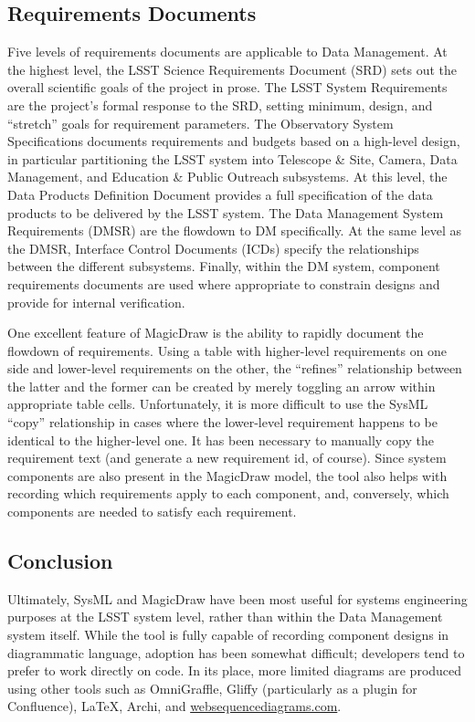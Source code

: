 \subsection{Requirements Documents}

Five levels of requirements documents are applicable to Data Management.
At the highest level, the LSST Science Requirements Document (SRD)\cite{LPM-17} sets out the overall scientific goals of the project in prose.
The LSST System Requirements\cite{LSE-29} are the project's formal response to the SRD, setting minimum, design, and ``stretch'' goals for requirement parameters.
The Observatory System Specifications\cite{LSE-30} documents requirements and budgets based on a high-level design, in particular partitioning the LSST system into Telescope \& Site, Camera, Data Management, and Education \& Public Outreach subsystems.
At this level, the Data Products Definition Document\cite{LSE-163} provides a full specification of the data products to be delivered by the LSST system.
The Data Management System Requirements (DMSR)\cite{LSE-61} are the flowdown to DM specifically.
At the same level as the DMSR, Interface Control Documents (ICDs) specify the relationships between the different subsystems.
Finally, within the DM system, component requirements documents are used where appropriate to constrain designs and provide for internal verification.

One  excellent feature of MagicDraw is the ability to rapidly document the flowdown of requirements.
Using a table with higher-level requirements on one side and lower-level requirements on the other, the ``refines'' relationship between the latter and the former can be created by merely toggling an arrow within appropriate table cells.
Unfortunately, it is more difficult to use the SysML ``copy'' relationship in cases where the lower-level requirement happens to be identical to the higher-level one.
It has been necessary to manually copy the requirement text (and generate a new requirement id, of course).
Since system components are also present in the MagicDraw model, the tool also helps with recording which requirements apply to each component, and, conversely, which components are needed to satisfy each requirement.

\subsection{Conclusion}

Ultimately, SysML and MagicDraw have been most useful for systems engineering purposes at the LSST system level, rather than within the Data Management system itself.
While the tool is fully capable of recording component designs in diagrammatic language, adoption has been somewhat difficult; developers tend to prefer to work directly on code.
In its place, more limited diagrams are produced using other tools such as OmniGraffle, Gliffy (particularly as a plugin for Confluence), LaTeX, Archi, and \href{http://websequencediagrams.com}{websequencediagrams.com}.
